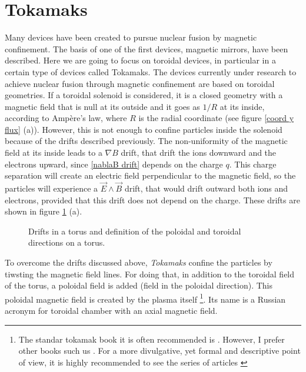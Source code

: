 \documentclass[a4paper,12pt,oneside]{book}
\begin{document}

\section{Tokamaks}
\label{sec_tokamaks}
Many devices have been created to pursue nuclear fusion by magnetic confinement. The basis of one of the first devices, magnetic mirrors, have been described. Here we are going to focus on toroidal devices, in particular in a certain type of devices called Tokamaks.
%
The devices currently under research to achieve nuclear fusion through magnetic confinement are based on toroidal geometries. If a toroidal solenoid is considered, it is a closed geometry with a magnetic field that is null at its outside and it goes as $1/R$ at its inside, according to Ampère's law, where $R$ is the radial coordinate (see figure \ref{coord y flux} (a)). However, this is not enough to confine particles inside the solenoid because of the drifts described previously. The non-uniformity of the magnetic field at its inside leads to a  $\nabla B$ drift, that drift the ions downward and the electrons upward, since \eqref{nablaB drift} depends on the charge $q$. This charge separation will create an electric field perpendicular to the magnetic field, so the particles will experience a $\vec{E} \wedge \vec{B}$ drift, that would drift outward both ions and electrons, provided that this drift does not depend on the charge. These drifts are shown in  figure \ref{fig drifts torus} (a).

\begin{figure}[htbp]
\centering
{}
\hfill
{}
\caption{Drifts in a torus and definition of the poloidal and toroidal directions on a torus.}
\label{fig drifts torus}
\end{figure}



To overcome the drifts discussed above, \textit{Tokamaks} confine the particles by tiwsting the magnetic field lines. For doing that, in addition to the toroidal field of the torus, a poloidal field is added (field in the poloidal direction). This poloidal magnetic field is created by the plasma itself \footnote{The standar tokamak book it is often recommended is \cite{Wesson}. However, I prefer other books such us \cite{Miyamoto}. For a more divulgative, yet formal and descriptive point of view, it is highly recommended to see the series of articles \cite{Sertok1, Sertok2, Sertok3, Sertok4}}. Its name is a Russian acronym for toroidal chamber with an axial magnetic field. 
\end{document}
